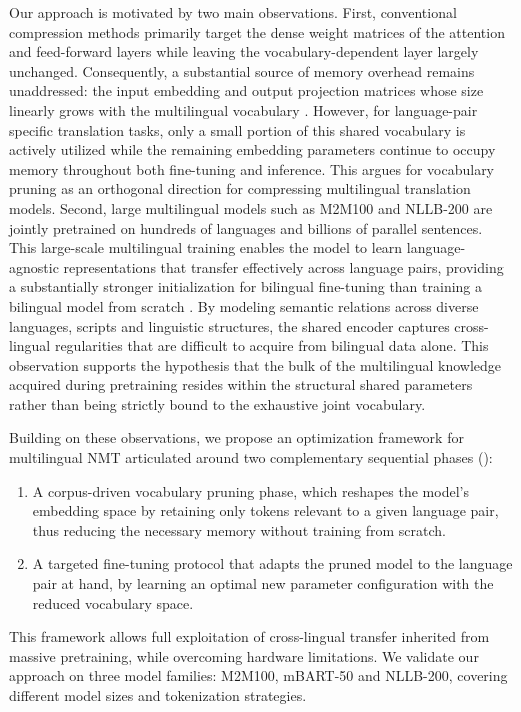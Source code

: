 \documentclass{article}
\begin{document}
	Our approach is motivated by two main observations. First, conventional compression
	methods primarily target the dense weight matrices of the attention and feed-forward layers
	while leaving the vocabulary-dependent layer largely unchanged. Consequently, a substantial
	source of memory overhead remains unaddressed: the input embedding and output projection
	matrices whose size linearly grows with the multilingual vocabulary \citep{fan2021beyond}.
	However, for language-pair specific translation tasks, only a small portion of this shared
	vocabulary is actively utilized while the remaining embedding parameters continue to occupy
	memory throughout both fine-tuning and inference. This argues for vocabulary pruning as an
	orthogonal direction for compressing multilingual translation models. Second, large
	multilingual models such as M2M100 and NLLB-200 are jointly pretrained on hundreds of
	languages and billions of parallel sentences. This large-scale multilingual training enables the
	model to learn language-agnostic representations that transfer effectively across language
	pairs, providing a substantially stronger initialization for bilingual fine-tuning than training a
	bilingual model from scratch \citep{arivazhagan2019massively}. By modeling semantic relations
	across diverse languages, scripts and linguistic structures, the shared encoder captures cross-
	lingual regularities that are difficult to acquire from bilingual data alone. This observation
	supports the hypothesis that the bulk of the multilingual knowledge acquired during
	pretraining resides within the structural shared parameters rather than being strictly bound to
	the exhaustive joint vocabulary.
	
	Building on these observations, we propose an optimization framework for multilingual NMT
	articulated around two complementary sequential phases ():
	\begin{enumerate}
		\item A corpus-driven vocabulary pruning phase, which reshapes the model's embedding space
		by retaining only tokens relevant to a given language pair, thus reducing the necessary
		memory without training from scratch.
		\item A targeted fine-tuning protocol that adapts the pruned model to the language pair at hand,
		by learning an optimal new parameter configuration with the reduced vocabulary space.
	\end{enumerate}
	This framework allows full exploitation of cross-lingual transfer inherited from massive
	pretraining, while overcoming hardware limitations. We validate our approach on three model
	families: M2M100, mBART-50 and NLLB-200, covering different model sizes and
	tokenization strategies.
	
\end{document}
